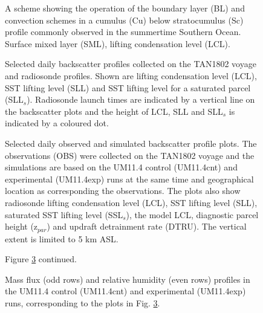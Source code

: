 \begin{figure}[t]
\caption{A scheme showing the operation of the boundary layer (BL)
and convection schemes in a cumulus (Cu) below stratocumulus (Sc) profile
commonly observed in the summertime Southern Ocean. Surface mixed layer (SML),
lifting condensation level (LCL).
}
\label{fig:scheme}
\end{figure}

\clearpage

\begin{figure}[t]
\caption{Selected daily backscatter profiles collected on the TAN1802 voyage
and radiosonde profiles. Shown are lifting condensation level (LCL),
SST lifting level (SLL) and SST lifting level for a saturated parcel (SLL$_s$).
Radiosonde launch times are indicated by a vertical line on the backscatter
plots and the height of LCL, SLL and SLL$_s$ is indicated by a coloured dot.
}
\label{fig:backscatter-rs}
\end{figure}

\clearpage

\begin{figure}[t]
\caption{Selected daily observed and simulated backscatter profile plots.
The observations (OBS) were collected on the TAN1802 voyage and the
simulations are based on the UM11.4 control (UM11.4cnt) and experimental (UM11.4exp) runs
at the same time and geographical location as corresponding the observations.
The plots also show radiosonde lifting condensation level (LCL), SST lifting level (SLL), saturated SST lifting level (SSL$_s$), the model LCL, diagnostic parcel height (z$_{par}$) and
updraft detrainment rate (DTRU). The vertical extent is limited to 5 km ASL.
}
\label{fig:examples}
\end{figure}

\clearpage

\begin{figure}[t]
\caption{Figure \ref{fig:examples} continued.
}
\label{fig:examples-cont}
\end{figure}

\clearpage

\begin{figure}[t]
\caption{Mass flux (odd rows) and relative humidity (even rows) profiles in the UM11.4 control (UM11.4cnt)
and experimental (UM11.4exp) runs, corresponding to the plots in Fig. \ref{fig:examples}.
}
\label{fig:examples-hur-mcu}
\end{figure}

